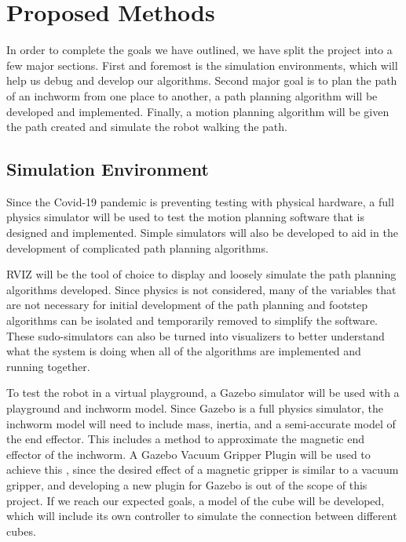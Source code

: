\section{Proposed Methods}
In order to complete the goals we have outlined, we have split the project into a few major sections. First and foremost is the simulation environments, which will help us debug and develop our algorithms. Second major goal is to plan the path of an inchworm from one place to another, a path planning algorithm will be developed and implemented. Finally,  a motion planning algorithm will be given the path created and simulate the robot walking the path.

\subsection{Simulation Environment}
Since the Covid-19 pandemic is preventing testing with physical hardware, a full physics simulator will be used to test the motion planning software that is designed and implemented. Simple simulators will also be developed to aid in the development of complicated path planning algorithms.

RVIZ will be the tool of choice to display and loosely simulate the path planning algorithms developed. Since physics is not considered, many of the variables that are not necessary for initial development of the path planning and footstep algorithms can be isolated and temporarily removed to simplify the software. These sudo-simulators can also be turned into visualizers to better understand what the system is doing when all of the algorithms are implemented and running together.

To test the robot in a virtual playground, a Gazebo simulator will be used with a playground and inchworm model. Since Gazebo is a full physics simulator, the inchworm model will need to include mass, inertia, and a semi-accurate model of the end effector. This includes a method to approximate the magnetic end effector of the inchworm. A Gazebo Vacuum Gripper Plugin will be used to achieve this \cite{GazeboVacuumGripper}\cite{MagnetFeetAnswers}, since the desired effect of a magnetic gripper is similar to a vacuum gripper, and developing a new plugin for Gazebo is out of the scope of this project. If we reach our expected goals, a model of the cube will be developed, which will include its own controller to simulate the connection between different cubes.


